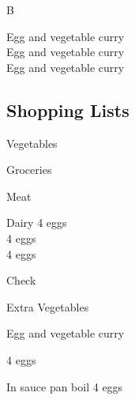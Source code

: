 		\begin{menu}{B}

    Egg and vegetable curry\\
    Egg and vegetable curry\\
    Egg and vegetable curry\\
    
    \subsection*{Shopping Lists}
      \begin{shoppinglist}{Vegetables}
      \end{shoppinglist}%
      \begin{shoppinglist}{Groceries}
      \end{shoppinglist}%
      \par\vfil %
      \begin{shoppinglist}{Meat}
      \end{shoppinglist}%
      \begin{shoppinglist}{Dairy}
      4  eggs \\ 
      4  eggs \\ 
      4  eggs \\ 
      \end{shoppinglist}%
      \par\vfil %
      \vfil\clearpage %
      \begin{shoppinglist}{Check}
      \end{shoppinglist}%
      \begin{shoppinglist}{Extra Vegetables}
      \end{shoppinglist}%
      \par\vfil %
    \vfil\clearpage
  
    \begin{recipe}{2}{Egg and vegetable curry}%
    
		\begin{ingredients}
		4  eggs  \\
	
		\end{ingredients}
	
    \begin{instructions}
    \item 
				In sauce pan boil
				4   eggs
    \end{instructions}
    \end{recipe}%
  

\end{menu}
